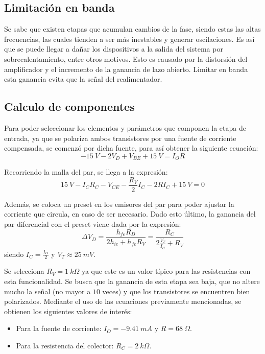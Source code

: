 \subsection{Limitación en banda}
Se sabe que  existen etapas que acumulan cambios de la fase, siendo estas las altas frecuencias, las cuales tienden a ser más inestables y generar oscilaciones. Es así que se puede llegar a dañar los dispositivos a la salida del sistema por sobrecalentamiento, entre otros motivos. Esto es causado por la distorsión del amplificador y el incremento de la ganancia de lazo abierto. Limitar en banda esta ganancia evita que la señal del realimentador.

\subsection{Calculo de componentes}
Para poder seleccionar los elementos y parámetros que componen la etapa de entrada, ya que se polariza ambos transistores por una fuente de corriente compensada, se comenzó por dicha fuente, para así obtener la siguiente ecuación:
\begin{equation}
	-15 \ V - 2V_{D} + V_{BE} + 15 \ V = I_O R 
\end{equation}

Recorriendo la malla del par, se llega a la expresión:
\begin{equation}
	15 \ V - I_C R_C - V_{CE} - \frac{R_V}{2} I_C - 2 R I_C + 15 \ V = 0
\end{equation}

Además, se coloca un preset en los emisores del par para poder ajustar la corriente que circula, en caso de ser necesario. Dado esto último, la ganancia del par diferencial con el preset viene dada por la expresión:
\begin{equation}
	\Delta V_D = \frac{h_{fe} R_D}{2 h_{ie} + h_{fe} R_V} = \frac{R_C}{2 \frac{V_T}{I_C} + R_V}
\end{equation}
siendo $I_C = \frac{I_O}{2}$ y $V_T \approx 25 \ mV$.

Se selecciona $R_V = 1 \ k\Omega$ ya que este es un valor típico para las resistencias con esta funcionalidad. Se busca que la ganancia de esta etapa sea baja, que no altere mucho la señal (no mayor a $10$ veces) y que los transistores se encuentren bien polarizados. Mediante el uso de las ecuaciones previamente mencionadas, se obtienen los siguientes valores de interés:
\begin{itemize}
	\item Para la fuente de corriente: $I_O = -9.41 \ mA$ y $R = 68 \ \Omega$.
	\item Para la resistencia del colector: $R_C = 2 \ k\Omega$.
\end{itemize}

